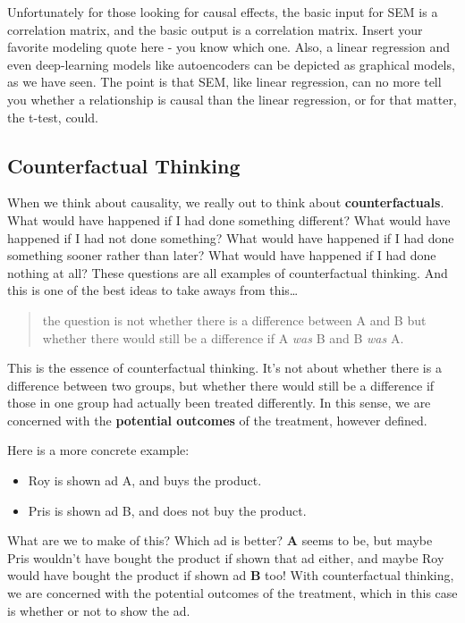 \documentclass[
  letterpaper,
]{krantz}
\providecommand{\tightlist}{%
  \setlength{\itemsep}{0pt}\setlength{\parskip}{0pt}}\usepackage{longtable,booktabs,array}
\begin{document}
Unfortunately for those looking for causal effects, the basic input for
SEM is a correlation matrix, and the basic output is a correlation
matrix. Insert your favorite modeling quote here - you know which one.
Also, a linear regression and even deep-learning models like
autoencoders can be depicted as graphical models, as we have seen. The
point is that SEM, like linear regression, can no more tell you whether
a relationship is causal than the linear regression, or for that matter,
the t-test, could.

\subsection{Counterfactual Thinking}\label{counterfactual-thinking}

When we think about causality, we really out to think about
\textbf{counterfactuals}. What would have happened if I had done
something different? What would have happened if I had not done
something? What would have happened if I had done something sooner
rather than later? What would have happened if I had done nothing at
all? These questions are all examples of counterfactual thinking. And
this is one of the best ideas to take aways from this\ldots{}

\begin{quote}
the question is not whether there is a difference between A and B but
whether there would still be a difference if A \emph{was} B and B
\emph{was} A.
\end{quote}

This is the essence of counterfactual thinking. It's not about whether
there is a difference between two groups, but whether there would still
be a difference if those in one group had actually been treated
differently. In this sense, we are concerned with the \textbf{potential
outcomes} of the treatment, however defined.

Here is a more concrete example:

\begin{itemize}
\tightlist
\item
  Roy is shown ad A, and buys the product.
\item
  Pris is shown ad B, and does not buy the product.
\end{itemize}

What are we to make of this? Which ad is better? \textbf{A} seems to be,
but maybe Pris wouldn't have bought the product if shown that ad either,
and maybe Roy would have bought the product if shown ad \textbf{B} too!
With counterfactual thinking, we are concerned with the potential
outcomes of the treatment, which in this case is whether or not to show
the ad.
\end{document}
